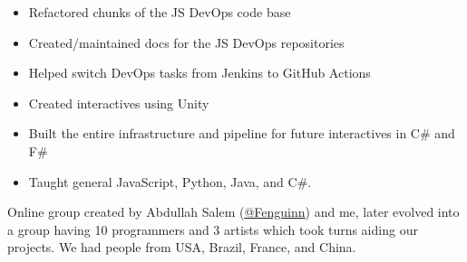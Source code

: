 \documentclass[10pt,a4paper,ragged2e,withhyper]{altacv}
\begin{document}
	\begin{paracol}{2}
		
		
		\divider
		
		
		
		\begin{itemize}
			\item Refactored chunks of the JS DevOps code base
			\item Created/maintained docs for the JS DevOps repositories
			\item Helped switch DevOps tasks from Jenkins to GitHub Actions
			\item Created interactives using Unity
			\item Built the entire infrastructure and pipeline for future interactives in C\# and F\#
		\end{itemize}
		
		
		\divider
		
		\begin{itemize}
			\item Taught general JavaScript, Python, Java, and C\#.
		\end{itemize}
		
		
		\divider
		
		\vspace{-0.3cm}
		\begin{justify}
			Online group created by Abdullah Salem (\href{https://github.com/Fenguinn}{\uline{@Fenguinn}}) and me, later evolved into a group having 10 programmers and 3 artists which took turns aiding our projects. We had people from USA, Brazil, France, and China.
		\end{justify}
		\vspace{-0.2cm}
		\medskip
		

\end{paracol}
\end{document}

